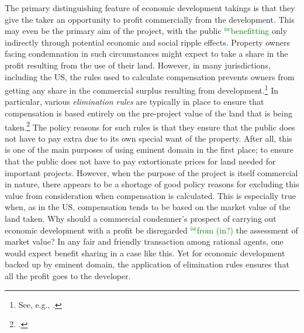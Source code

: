 \documentclass[12pt,a4paper]{book} %
\newcommand{\isr}[1]{\textcolor{green}{$^{\textrm{isr}}${#1}}}
\begin{document}
The primary distinguishing feature of economic development takings is that they give the taker an opportunity to profit commercially from the development. This may even be the primary aim of the project, with the public \isr{benefitting} only indirectly through potential economic and social ripple effects. Property owners facing condemnation in such circumstances might expect to take a share in the profit resulting from the use of their land. However, in many jurisdictions, including the US, the rules used to calculate compensation prevents owners from getting any share in the commercial surplus resulting from development.\footnote{See, e.g., \cite[965-966]{fennell04}.} In particular, various {\it elimination rules} are typically in place to ensure that compensation is based entirely on the pre-project value of the land that is being taken.\footcite[See][81]{ackerman06} The policy reasons for such rules is that they ensure that the public does not have to pay extra due to its own special want of the property. After all, this is one of the main purposes of using eminent domain in the first place; to ensure that the public does not have to pay extortionate prices for land needed for important projects. However, when the purpose of the project is itself commercial in nature, there appears to be a shortage of good policy reasons for excluding this value from consideration when compensation is calculated. This is especially true when, as in the US, compensation tends to be based on the market value of the land taken. Why should a commercial condemner's prospect of carrying out economic development with a profit be disregarded \isr{from (in?)} the assessment of market value? In any fair and friendly transaction among rational agents, one would expect benefit sharing in a case like this. Yet for economic development backed up by eminent domain, the application of elimination rules ensures that all the profit goes to the developer. 
\end{document}
